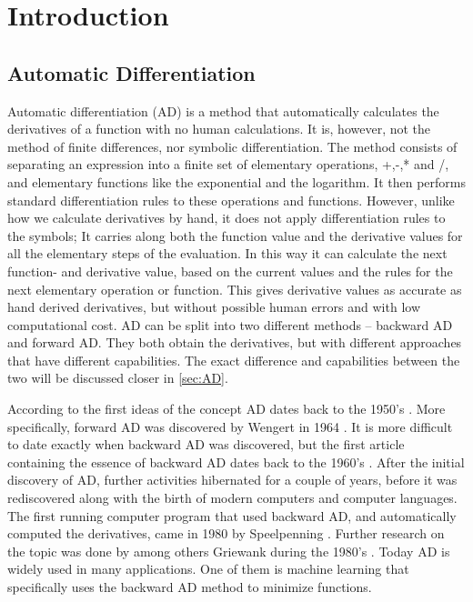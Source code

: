 \chapter{Introduction}
\section{Automatic Differentiation}
Automatic differentiation (AD) is a method that automatically calculates the derivatives of a function with no human calculations. It is, however, not the method of finite differences, nor symbolic differentiation. The method consists of separating an expression into a finite set of elementary operations, +,-,* and /, and elementary functions like the exponential and the logarithm. It then performs standard differentiation rules to these operations and functions. However, unlike how we calculate derivatives by hand, it does not apply differentiation rules to the symbols; It carries along both the function value and the derivative values for all the elementary steps of the evaluation. In this way it can calculate the next function- and derivative value, based on the current values and the rules for the next elementary operation or function. This gives derivative values as accurate as hand derived derivatives, but without possible human errors and with low computational cost. AD can be split into two different methods -- backward AD and forward AD. They both obtain the derivatives, but with different approaches that have different capabilities. The exact difference and capabilities between the two will be discussed closer in \autoref{sec:AD}. 

According to \emph{\cite{SurveyAD}} the first ideas of the concept AD dates back to the 1950's \emph{\citep{nolan1953analytical, beda1959programs}}. More specifically, forward AD was discovered by Wengert in 1964 \emph{\citep{wengert1964simple}}. It is more difficult to date exactly when backward AD was discovered, but the first article containing the essence of backward AD dates back to the 1960's \emph{\citep{boltyanskii1960theory}}. After the initial discovery of AD, further activities hibernated for a couple of years, before it was rediscovered along with the birth of modern computers and computer languages. The first running computer program that used backward AD, and automatically computed the derivatives, came in 1980 by Speelpenning \emph{\citep{speelpenning1980compiling}}. Further research on the topic was done by among others Griewank during the 1980's \emph{\citep{griewank1989automatic}}. Today AD is widely used in many applications. One of them is machine learning that specifically uses the backward AD method to minimize functions. 

